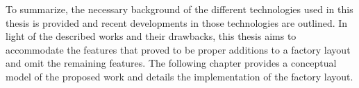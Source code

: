 To summarize, the necessary background of the different technologies used in this thesis is provided and recent developments in those technologies are outlined. In light of the described works and their drawbacks, this thesis aims to accommodate the features that proved to be proper additions to a factory layout and omit the remaining features. The following chapter provides a conceptual model of the proposed work and details the implementation of the factory layout.